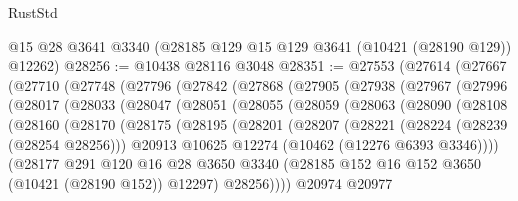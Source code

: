 \begin{lexlean}{RustStd}
\begin{coremodule}
    @15
    @28
    @3641
    @3340
    (@28185 @129 @15 @129 @3641 (@10421 (@28190 @129)) @12262)
@28256 := @10438 @28116 @3048
@28351 := @27553
    (@27614
      (@27667
        (@27710
          (@27748
            (@27796
              (@27842
                (@27868
                  (@27905
                    (@27938
                      (@27967
                        (@27996
                          (@28017
                            (@28033
                              (@28047
                                (@28051
                                  (@28055
                                    (@28059
                                      (@28063
                                        (@28090
                                          (@28108
                                            (@28160
                                              (@28170
                                                (@28175
                                                  (@28195
                                                    (@28201
                                                      (@28207
                                                        (@28221
                                                          (@28224 (@28239 (@28254 @28256)))
                                                          @20913
                                                          @10625
                                                          @12274
                                                          (@10462 (@12276 @6393 @3346))))
                                                      (@28177
                                                        @291
                                                        @120
                                                        @16
                                                        @28
                                                        @3650
                                                        @3340
                                                        (@28185
                                                          @152
                                                          @16
                                                          @152
                                                          @3650
                                                          (@10421 (@28190 @152))
                                                          @12297)
                                                        @28256))))
                                                @20974
                                                @20977

\end{coremodule}
\end{lexlean}
